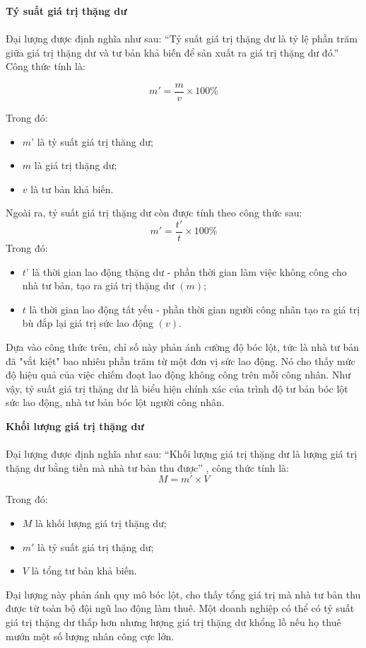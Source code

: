 \textbf{Tý suất giá trị thặng dư}\\\\
Đại lượng được định nghĩa như sau: “Tỷ suất giá trị thặng dư là tỷ lệ phần trăm giữa giá trị thặng dư và tư bản khả biến để sản xuất ra giá trị thặng dư đó.” \cite[trang 90]{gt} Công thức tính là:

$$m'=\frac{m}{v}\times100\%$$

Trong đó:
\begin{itemize}
    \item $m’$ là tỷ suất giá trị thăng dư;
    \item $m$ là giá trị thặng dư;
    \item $v$ là tư bản khả biến.
\end{itemize}
Ngoài ra, tỷ suất giá trị thặng dư còn được tính theo công thức sau:
$$m'=\frac{t'}{t}\times100\%$$
Trong đó:
\begin{itemize}
    \item $t’$ là thời gian lao động thặng dư - phần thời gian làm việc không công cho nhà tư bản, tạo ra giá trị thặng dư $(m)$;
    \item $t$ là thời gian lao động tất yếu - phần thời gian người công nhân tạo ra giá trị bù đắp lại giá trị sức lao động $(v)$.
\end{itemize}
Dựa vào công thức trên, chỉ số này phản ánh cường độ bóc lột, tức là nhà tư bản đã "vắt kiệt" bao nhiêu phần trăm từ một đơn vị sức lao động. Nó cho thấy mức độ hiệu quả của việc chiếm đoạt lao động không công trên mỗi công nhân. Như vậy, tỷ suất giá trị thặng dư là biểu hiện chính xác của trình độ tư bản bóc lột sức lao động, nhà tư bản bóc lột người công nhân.

\textbf{Khối lượng giá trị thặng dư}\\\\
Đại lượng được định nghĩa như sau: “Khối lượng giá trị thặng dư là lượng giá trị thặng dư bằng tiền mà nhà tư bản thu được”
\cite[trang 91]{gt}, công thức tính là:
$$ M = m'\times V$$

Trong đó:
\begin{itemize}
    \item $M$ là khối lượng giá trị thặng dư;
    \item $m'$ là tỷ suất giá trị thặng dư;
    \item $V$ là tổng tư bản khả biến.
\end{itemize}
	Đại lượng này phản ánh quy mô bóc lột, cho thấy tổng giá trị mà nhà tư bản thu được từ toàn bộ đội ngũ lao động làm thuê. Một doanh nghiệp có thể có tỷ suất giá trị thặng dư thấp hơn nhưng lượng giá trị thặng dư khổng lồ nếu họ thuê mướn một số lượng nhân công cực lớn.

